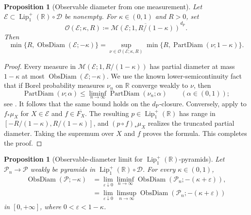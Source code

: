 \documentclass{amsart}
\theoremstyle{plain}
\newtheorem{proposition}[theorem]{Proposition}
\theoremstyle{definition}
\theoremstyle{remark}
\newcommand{\R}{\mathbb{R}}
\newcommand{\D}{\mathcal{D}}
\newcommand{\M}{\mathcal{M}}
\newcommand{\Lup}{\operatorname{Lip}^{+}_{1}(\R)}
\DeclareMathOperator{\pd}{PartDiam}
\DeclareMathOperator{\od}{ObsDiam}
\newcommand{\dpr}{d_{\operatorname{P}}}
\begin{document}
\begin{proposition}[Observable diameter from one measurement]
\label{prop:observable-diameter-from-one-measurement}
Let $\mathcal E\subset\Lup\circ\D$ be nonempty.  For
$\kappa\in(0,1)$ and $R>0$, set
\[ \mathcal O(\mathcal E;\kappa,R)\coloneqq \overline{\M(\mathcal E;1,R/(1-\kappa))}^{\dpr}. \]
Then
\begin{equation}
\label{eq:observable-diameter-from-one-measurement}
\min\{R,\od(\mathcal E;-\kappa)\}
=\sup_{\nu\in\mathcal O(\mathcal E;\kappa,R)}
\min\{R,\pd(\nu;1-\kappa)\}.
\end{equation}
\end{proposition}

\begin{proof}
Every measure in $\M(\mathcal E;1,R/(1-\kappa))$ has partial diameter at
mass $1-\kappa$ at most $\od(\mathcal E;-\kappa)$.  We use the known
lower-semicontinuity fact that if Borel probability measures $\nu_n$ on
$\R$ converge weakly to $\nu$, then
\[ \pd(\nu;\alpha)\leq\liminf_{n\to\infty}\pd(\nu_n;\alpha) \qquad(\alpha\in(0,1)); \]
see \cite[Lemmas~3.8 and~3.1(1)]{ozawa2015limit}.  It follows that the
same bound holds on the $\dpr$-closure.  Conversely, apply
 to $f_*\mu_X$ for
$X\in\mathcal E$ and $f\in\overline{F_X}$.  The resulting
$p\in\Lup$ has range in
$[-R/(1-\kappa),R/(1-\kappa)]$, and $(p\circ f)_*\mu_X$ realizes the
truncated partial diameter.  Taking the supremum over $X$ and $f$ proves
the formula.  This completes the proof.
\end{proof}

\begin{proposition}[Observable-diameter limit for $\Lup$-pyramids]
\label{prop:lup-observable-diameter-pyramid-limit}
Let $\mathcal P_n\to\mathcal P$ weakly be pyramids in $\Lup\circ\D$.  For
every $\kappa\in(0,1)$,
\begin{align}
\od(\mathcal P;-\kappa)
&=\lim_{\varepsilon\downarrow0}\liminf_{n\to\infty}
\od(\mathcal P_n;-(\kappa+\varepsilon)),
\label{eq:obsdiam-pyramid-limit-liminf}\\
&=\lim_{\varepsilon\downarrow0}\limsup_{n\to\infty}
\od(\mathcal P_n;-(\kappa+\varepsilon))
\label{eq:obsdiam-pyramid-limit-limsup}
\end{align}
in $[0,+\infty]$, where $0<\varepsilon<1-\kappa$.
\end{proposition}
\end{document}
